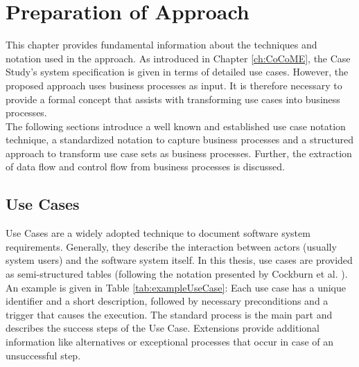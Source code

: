 \chapter{Preparation of Approach}
\label{ch:PrepApproach}
This chapter provides fundamental information about the techniques and notation used in the approach. As introduced in Chapter \ref{ch:CoCoME}, the Case Study's system specification is given in terms of detailed use cases. However, the proposed approach uses business processes as input. It is therefore necessary to provide a formal concept that assists with transforming use cases into business processes. \\
The following sections introduce a well known and established use case notation technique, a standardized notation to capture business processes and a structured approach to transform use case sets as business processes. Further, the extraction of data flow and control flow from business processes is discussed.


\section{Use Cases}
\label{sec:PrepApproach:UC}
Use Cases are a widely adopted technique to document software system requirements. Generally, they describe the interaction between actors (usually system users) and the software system itself. In this thesis, use cases are provided as semi-structured tables (following the notation presented by Cockburn et al. \cite{Cockburn}). \\ An example is given in Table \ref{tab:exampleUseCase}: Each use case has a unique identifier and a short description, followed by necessary preconditions and a trigger that causes the execution. The standard process is the main part and describes the success steps of the Use Case. Extensions provide additional information like alternatives or exceptional processes that occur in case of an unsuccessful step. 




